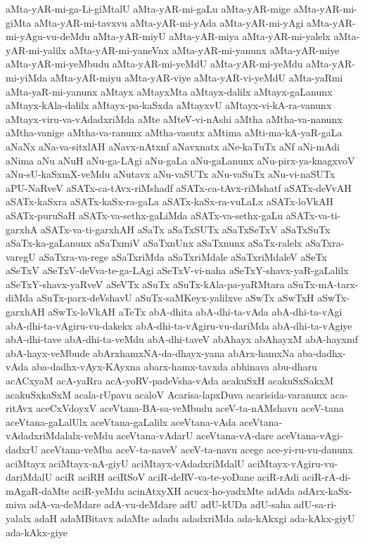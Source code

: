 {aMta-yAR-mi-ga-Li-giMtalU
aMta-yAR-mi-gaLu
aMta-yAR-mige
aMta-yAR-mi-giMta
aMta-yAR-mi-tavxvu
aMta-yAR-mi-yAda
aMta-yAR-mi-yAgi
aMta-yAR-mi-yAgu-vu-deMdu
aMta-yAR-miyU
aMta-yAR-miya
aMta-yAR-mi-yalelx
aMta-yAR-mi-yalilx
aMta-yAR-mi-yaneVnx
aMta-yAR-mi-yanunx
aMta-yAR-miye
aMta-yAR-mi-yeMbudu
aMta-yAR-mi-yeMdU
aMta-yAR-mi-yeMdu
aMta-yAR-mi-yiMda
aMta-yAR-miyu
aMta-yAR-viye
aMta-yAR-vi-yeMdU
aMta-yaRmi
aMta-yaR-mi-yanunx
aMtayx
aMtayxMta
aMtayx-dalilx
aMtayx-gaLanunx
aMtayx-kAla-dalilx
aMtayx-pa-kaSxda
aMtayxvU
aMtayx-vi-kA-ra-vanunx
aMtayx-viru-va-vAdadxriMda
aMte
aMteV-vi-nAshi
aMtha
aMtha-va-nanunx
aMtha-vanige
aMtha-va-ranunx
aMtha-vasutx
aMtima
aMti-ma-kA-yaR-gaLa
aNaNx
aNa-va-sitxlAH
aNavx-nAtxnf
aNavxnatx
aNe-kaTuTx
aNf
aNi-mAdi
aNima
aNu
aNuH
aNu-ga-LAgi
aNu-gaLa
aNu-gaLanunx
aNu-pirx-ya-knagxvoV
aNu-sU-kaSxmX-veMdu
aNutavx
aNu-vaSUTx
aNu-vaSuTx
aNu-vi-naSUTx
aPU-NaRveV
aSATx-ca-tAvx-riMshadf
aSATx-ca-tAvx-riMshatf
aSATx-deVvAH
aSATx-kaSxra
aSATx-kaSx-ra-gaLa
aSATx-kaSx-ra-vuLaLx
aSATx-loVkAH
aSATx-puruSaH
aSATx-va-sethx-gaLiMda
aSATx-va-sethx-gaLu
aSATx-va-ti-garxhA
aSATx-va-ti-garxhAH
aSaTx
aSaTxSUTx
aSaTxSeTxV
aSaTxSuTx
aSaTx-ka-gaLanunx
aSaTxmiV
aSaTxnUnx
aSaTxnunx
aSaTx-ralelx
aSaTxra-varegU
aSaTxra-va-rege
aSaTxriMda
aSaTxriMdale
aSaTxriMdaleV
aSeTx
aSeTxV
aSeTxV-deVva-te-ga-LAgi
aSeTxV-vi-naha
aSeTxY-shavx-yaR-gaLalilx
aSeTxY-shavx-yaRveV
aSeVTx
aSuTx
aSuTx-kAla-pa-yaRMtara
aSuTx-mA-tarx-diMda
aSuTx-parx-deVshavU
aSuTx-saMKeyx-yalilxve
aSwTx
aSwTxH
aSwTx-garxhAH
aSwTx-loVkAH
aTeTx
abA-dhita
abA-dhi-ta-vAda
abA-dhi-ta-vAgi
abA-dhi-ta-vAgiru-vu-dakekx
abA-dhi-ta-vAgiru-vu-dariMda
abA-dhi-ta-vAgiye
abA-dhi-tave
abA-dhi-ta-veMdu
abA-dhi-taveV
abAhayx
abAhayxM
abA-hayxmf
abA-hayx-veMbude
abArxhamxNA-da-dhayx-yana
abArx-hamxNa
aba-dadhx-vAda
aba-dadhx-vAyx-KAyxna
abarx-hamx-tavxda
abhinava
abu-dharu
acACxyaM
acA-yaRra
acA-yoRV-padeVsha-vAda
acakuSxH
acakuSxSakxM
acakuSxkaSxM
acala-rUpavu
acaloV
Acarisa-lapxDuva
acarisida-varanunx
aca-ritAvx
aceCxVdoyxV
aceVtana-BA-sa-veMbudu
aceV-ta-nAMshavu
aceV-tana
aceVtana-gaLalUlx
aceVtana-gaLalilx
aceVtana-vAda
aceVtana-vAdadxriMdalalx-veMdu
aceVtana-vAdarU
aceVtana-vA-dare
aceVtana-vAgi-dadxrU
aceVtana-veMba
aceV-ta-naveV
aceV-ta-navu
acege
ace-yi-ru-vu-danunx
aciMtayx
aciMtayx-nA-giyU
aciMtayx-vAdadxriMdalU
aciMtayx-vAgiru-vu-dariMdalU
aciR
aciRH
aciRSoV
aciR-deRV-va-te-yoDane
aciR-rAdi
aciR-rA-di-mAgaR-daMte
aciR-yeMdu
acinAtxyXH
acucx-ho-yadxMte
adAda
adArx-kaSx-miva
adA-va-deMdare
adA-vu-deMdare
adU
adU-kUDa
adU-saha
adU-sa-ri-yalalx
adaH
adaMBitavx
adaMte
adadu
adadxriMda
ada-kAkxgi
ada-kAkx-giyU
ada-kAkx-giye
}
